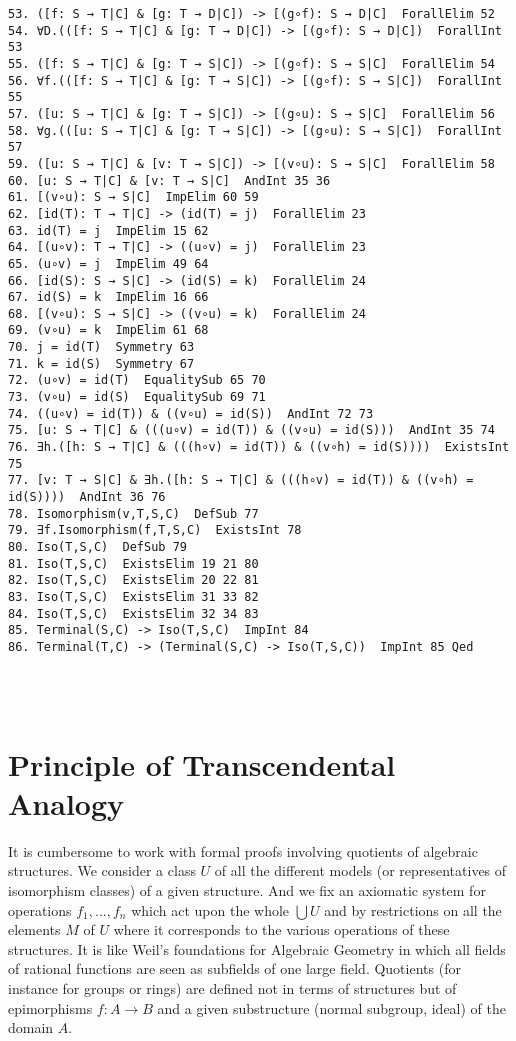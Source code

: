 \documentclass[a4paper,12pt,leqno]{article}
\numberwithin{equation}{section}
\begin{document}
\begin{verbatim}
53. ([f: S → T|C] & [g: T → D|C]) -> [(g∘f): S → D|C]  ForallElim 52
54. ∀D.(([f: S → T|C] & [g: T → D|C]) -> [(g∘f): S → D|C])  ForallInt 53
55. ([f: S → T|C] & [g: T → S|C]) -> [(g∘f): S → S|C]  ForallElim 54
56. ∀f.(([f: S → T|C] & [g: T → S|C]) -> [(g∘f): S → S|C])  ForallInt 55
57. ([u: S → T|C] & [g: T → S|C]) -> [(g∘u): S → S|C]  ForallElim 56
58. ∀g.(([u: S → T|C] & [g: T → S|C]) -> [(g∘u): S → S|C])  ForallInt 57
59. ([u: S → T|C] & [v: T → S|C]) -> [(v∘u): S → S|C]  ForallElim 58
60. [u: S → T|C] & [v: T → S|C]  AndInt 35 36
61. [(v∘u): S → S|C]  ImpElim 60 59
62. [id(T): T → T|C] -> (id(T) = j)  ForallElim 23
63. id(T) = j  ImpElim 15 62
64. [(u∘v): T → T|C] -> ((u∘v) = j)  ForallElim 23
65. (u∘v) = j  ImpElim 49 64
66. [id(S): S → S|C] -> (id(S) = k)  ForallElim 24
67. id(S) = k  ImpElim 16 66
68. [(v∘u): S → S|C] -> ((v∘u) = k)  ForallElim 24
69. (v∘u) = k  ImpElim 61 68
70. j = id(T)  Symmetry 63
71. k = id(S)  Symmetry 67
72. (u∘v) = id(T)  EqualitySub 65 70
73. (v∘u) = id(S)  EqualitySub 69 71
74. ((u∘v) = id(T)) & ((v∘u) = id(S))  AndInt 72 73
75. [u: S → T|C] & (((u∘v) = id(T)) & ((v∘u) = id(S)))  AndInt 35 74
76. ∃h.([h: S → T|C] & (((h∘v) = id(T)) & ((v∘h) = id(S))))  ExistsInt 75
77. [v: T → S|C] & ∃h.([h: S → T|C] & (((h∘v) = id(T)) & ((v∘h) = id(S))))  AndInt 36 76
78. Isomorphism(v,T,S,C)  DefSub 77
79. ∃f.Isomorphism(f,T,S,C)  ExistsInt 78
80. Iso(T,S,C)  DefSub 79
81. Iso(T,S,C)  ExistsElim 19 21 80
82. Iso(T,S,C)  ExistsElim 20 22 81
83. Iso(T,S,C)  ExistsElim 31 33 82
84. Iso(T,S,C)  ExistsElim 32 34 83
85. Terminal(S,C) -> Iso(T,S,C)  ImpInt 84
86. Terminal(T,C) -> (Terminal(S,C) -> Iso(T,S,C))  ImpInt 85 Qed
	
	
	
\end{verbatim}

\section*{Principle of Transcendental Analogy}

It is cumbersome to work with formal proofs involving quotients of algebraic structures.
We consider a class $U$ of all the different models (or representatives of isomorphism classes) of a given structure. And we fix an axiomatic system for operations $f_1,...,f_n$ which act upon the whole $\bigcup U$ and by restrictions on all the elements $M$ of  $U$ where it corresponds to the various operations of these structures.  It is like Weil's foundations for Algebraic Geometry in which all fields of rational functions are seen as subfields of one large field.
Quotients (for instance for groups or rings) are defined not in terms of structures but of epimorphisms $f:A\rightarrow B$  and a given substructure (normal subgroup, ideal) of the domain $A$.
\end{document}
